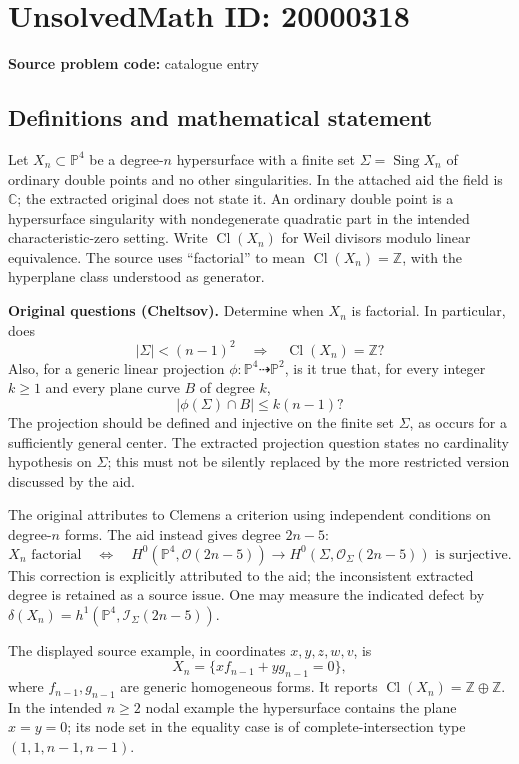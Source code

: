 \documentclass[11pt]{article}
\newcommand{\Z}{\mathbb{Z}}
\newcommand{\C}{\mathbb{C}}
\newcommand{\PP}{\mathbb{P}}
\begin{document}
\section*{UnsolvedMath ID: 20000318}
\textbf{Source problem code:} catalogue entry
\subsection{Definitions and mathematical statement}
Let $X_n\subset\PP^4$ be a degree-$n$ hypersurface with a finite set $\Sigma=\operatorname{Sing}X_n$ of ordinary double points and no other singularities. In the attached aid the field is $\C$; the extracted original does not state it. An ordinary double point is a hypersurface singularity with nondegenerate quadratic part in the intended characteristic-zero setting. Write $\operatorname{Cl}(X_n)$ for Weil divisors modulo linear equivalence. The source uses ``factorial'' to mean $\operatorname{Cl}(X_n)=\Z$, with the hyperplane class understood as generator.

\textbf{Original questions (Cheltsov).} Determine when $X_n$ is factorial. In particular, does
\[|\Sigma|<(n-1)^2\quad\Longrightarrow\quad\operatorname{Cl}(X_n)=\Z?\]
Also, for a generic linear projection $\phi:\PP^4\dashrightarrow\PP^2$, is it true that, for every integer $k\ge1$ and every plane curve $B$ of degree $k$,
\[|\phi(\Sigma)\cap B|\le k(n-1)?\]
The projection should be defined and injective on the finite set $\Sigma$, as occurs for a sufficiently general center. The extracted projection question states no cardinality hypothesis on $\Sigma$; this must not be silently replaced by the more restricted version discussed by the aid.

The original attributes to Clemens a criterion using independent conditions on degree-$n$ forms. The aid instead gives degree $2n-5$:
\[X_n\text{ factorial}\quad\Longleftrightarrow\quad H^0(\PP^4,\mathcal O(2n-5))\longrightarrow H^0(\Sigma,\mathcal O_\Sigma(2n-5))\text{ is surjective}.\]
This correction is explicitly attributed to the aid; the inconsistent extracted degree is retained as a source issue. One may measure the indicated defect by $\delta(X_n)=h^1(\PP^4,\mathcal I_\Sigma(2n-5))$.

The displayed source example, in coordinates $x,y,z,w,v$, is
\[X_n=\{xf_{n-1}+yg_{n-1}=0\},\]
where $f_{n-1},g_{n-1}$ are generic homogeneous forms. It reports $\operatorname{Cl}(X_n)=\Z\oplus\Z$. In the intended $n\ge2$ nodal example the hypersurface contains the plane $x=y=0$; its node set in the equality case is of complete-intersection type $(1,1,n-1,n-1)$.
\end{document}
